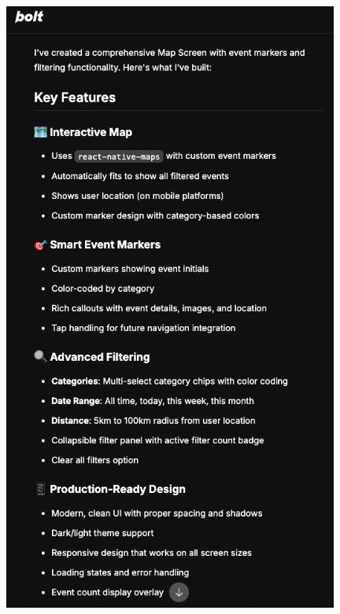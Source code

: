 \begin{figure}[htbp]
      \centering
      \begin{minipage}{0.48\textwidth}
            \centering
            \includegraphics[width=0.98\textwidth]{images/bolt_screenshots/eingabe des prompts-rueckmeldung von bolt-1.png}
      \end{minipage}
      \hfill
      \begin{minipage}{0.48\textwidth}
            \centering

\end{minipage}
\end{figure}
